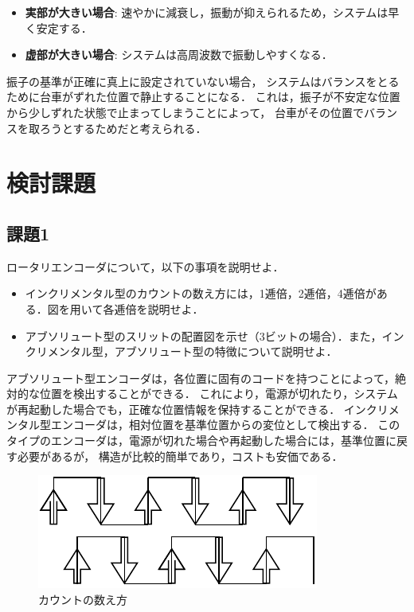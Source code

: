 \begin{itemize}
  \item \textbf{実部が大きい場合}: 速やかに減衰し，振動が抑えられるため，システムは早く安定する．
  \item \textbf{虚部が大きい場合}: システムは高周波数で振動しやすくなる．
\end{itemize}

振子の基準が正確に真上に設定されていない場合，
システムはバランスをとるために台車がずれた位置で静止することになる．
これは，振子が不安定な位置から少しずれた状態で止まってしまうことによって，
台車がその位置でバランスを取ろうとするためだと考えられる．

\section{検討課題}

\subsection*{課題1}
ロータリエンコーダについて，以下の事項を説明せよ．
\begin{itemize}
  \item インクリメンタル型のカウントの数え方には，1逓倍，2逓倍，4逓倍がある．図を用いて各逓倍を説明せよ．
  \item アブソリュート型のスリットの配置図を示せ（3ビットの場合）．また，インクリメンタル型，アブソリュート型の特徴について説明せよ．
\end{itemize}

アブソリュート型エンコーダは，各位置に固有のコードを持つことによって，絶対的な位置を検出することができる．
これにより，電源が切れたり，システムが再起動した場合でも，正確な位置情報を保持することができる．
インクリメンタル型エンコーダは，相対位置を基準位置からの変位として検出する．
このタイプのエンコーダは，電源が切れた場合や再起動した場合には，基準位置に戻す必要があるが，
構造が比較的簡単であり，コストも安価である．

\begin{figure}[h]
  \centering
  \includegraphics[scale=0.8]{sozai/11.pdf}
  \caption{カウントの数え方}
\end{figure}

